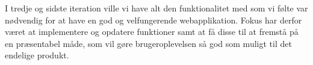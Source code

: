 I tredje og sidste iteration ville vi have alt den funktionalitet med som vi følte var nødvendig for at have en god og velfungerende webapplikation. Fokus har derfor været at implementere og opdatere funktioner samt at få disse til at fremstå på en præsentabel måde, som vil gøre brugeroplevelsen så god som muligt til det endelige produkt.














